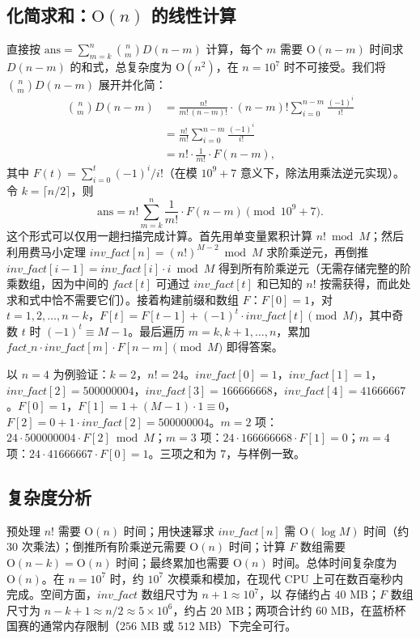 \subsection{化简求和：$\mathrm{O}(n)$ 的线性计算}

直接按 $\mathrm{ans} = \sum_{m=k}^{n} \binom{n}{m} D(n - m)$ 计算，每个 $m$ 需要 $\mathrm{O}(n - m)$ 时间求 $D(n - m)$ 的和式，总复杂度为 $\mathrm{O}(n^2)$，在 $n = 10^7$ 时不可接受。我们将 $\binom{n}{m} D(n - m)$ 展开并化简：
\begin{align*}
\binom{n}{m} D(n - m)
    &= \frac{n!}{m!\,(n - m)!} \cdot (n - m)! \sum_{i=0}^{n - m} \frac{(-1)^i}{i!} \\
    &= \frac{n!}{m!} \sum_{i=0}^{n - m} \frac{(-1)^i}{i!} \\
    &= n! \cdot \frac{1}{m!} \cdot F(n - m),
\end{align*}
其中 $F(t) = \sum_{i=0}^{t} (-1)^i / i!$（在模 $10^9 + 7$ 意义下，除法用乘法逆元实现）。令 $k = \lceil n/2 \rceil$，则
\[
\mathrm{ans} = n! \sum_{m=k}^{n} \frac{1}{m!} \cdot F(n - m) \pmod{10^9 + 7}.
\]
这个形式可以仅用一趟扫描完成计算。首先用单变量累积计算 $n! \bmod M$；然后利用费马小定理 $\mathit{inv\_fact}[n] = (n!)^{M - 2} \bmod M$ 求阶乘逆元，再倒推 $\mathit{inv\_fact}[i - 1] = \mathit{inv\_fact}[i] \cdot i \bmod M$ 得到所有阶乘逆元（无需存储完整的阶乘数组，因为中间的 $\mathit{fact}[t]$ 可通过 $\mathit{inv\_fact}[t]$ 和已知的 $n!$ 按需获得，而此处求和式中恰不需要它们）。接着构建前缀和数组 $F$：$F[0] = 1$，对 $t = 1, 2, \ldots, n - k$，$F[t] = F[t - 1] + (-1)^t \cdot \mathit{inv\_fact}[t] \pmod M$，其中奇数 $t$ 时 $(-1)^t \equiv M - 1$。最后遍历 $m = k, k + 1, \ldots, n$，累加 $\mathit{fact\_n} \cdot \mathit{inv\_fact}[m] \cdot F[n - m] \pmod M$ 即得答案。

以 $n = 4$ 为例验证：$k = 2$，$n! = 24$。$\mathit{inv\_fact}[0] = 1$，$\mathit{inv\_fact}[1] = 1$，$\mathit{inv\_fact}[2] = 500000004$，$\mathit{inv\_fact}[3] = 166666668$，$\mathit{inv\_fact}[4] = 41666667$。$F[0] = 1$，$F[1] = 1 + (M - 1) \cdot 1 \equiv 0$，$F[2] = 0 + 1 \cdot \mathit{inv\_fact}[2] = 500000004$。$m = 2$ 项：$24 \cdot 500000004 \cdot F[2] \bmod M$；$m = 3$ 项：$24 \cdot 166666668 \cdot F[1] = 0$；$m = 4$ 项：$24 \cdot 41666667 \cdot F[0] = 1$。三项之和为 $7$，与样例一致。

\subsection{复杂度分析}

预处理 $n!$ 需要 $\mathrm{O}(n)$ 时间；用快速幂求 $\mathit{inv\_fact}[n]$ 需 $\mathrm{O}(\log M)$ 时间（约 $30$ 次乘法）；倒推所有阶乘逆元需要 $\mathrm{O}(n)$ 时间；计算 $F$ 数组需要 $\mathrm{O}(n - k) = \mathrm{O}(n)$ 时间；最终累加也需要 $\mathrm{O}(n)$ 时间。总体时间复杂度为 $\mathrm{O}(n)$。在 $n = 10^7$ 时，约 $10^7$ 次模乘和模加，在现代 CPU 上可在数百毫秒内完成。空间方面，$\mathit{inv\_fact}$ 数组尺寸为 $n + 1 \approx 10^7$，以  存储约占 $40$ MB；$F$ 数组尺寸为 $n - k + 1 \approx n/2 \approx 5 \times 10^6$，约占 $20$ MB；两项合计约 $60$ MB，在蓝桥杯国赛的通常内存限制（$256$ MB 或 $512$ MB）下完全可行。

